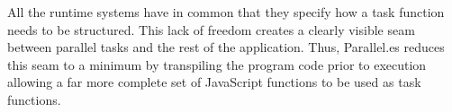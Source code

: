 All the runtime systems have in common that they specify how a task function needs to be structured. This lack of freedom creates a clearly visible seam between parallel tasks and the rest of the application. Thus, Parallel.es reduces this seam to a minimum by transpiling the program code prior to execution allowing a far more complete set of JavaScript functions to be used as task functions.
